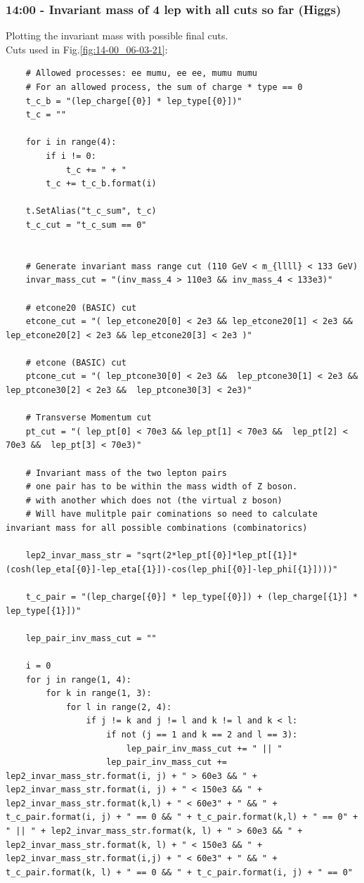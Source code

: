 \subsubsection{14:00 - Invariant mass of 4 lep with all cuts so far (Higgs)}
Plotting the invariant mass with possible final cuts.
\\
Cuts used in Fig.\ref{fig:14-00_06-03-21}:
\begin{lstlisting}
    # Allowed processes: ee mumu, ee ee, mumu mumu
    # For an allowed process, the sum of charge * type == 0 
    t_c_b = "(lep_charge[{0}] * lep_type[{0}])"  
    t_c = ""
    
    for i in range(4):
        if i != 0:
            t_c += " + "
        t_c += t_c_b.format(i)

    t.SetAlias("t_c_sum", t_c)
    t_c_cut = "t_c_sum == 0"
    
    
    # Generate invariant mass range cut (110 GeV < m_{llll} < 133 GeV)
    invar_mass_cut = "(inv_mass_4 > 110e3 && inv_mass_4 < 133e3)"
    
    # etcone20 (BASIC) cut
    etcone_cut = "( lep_etcone20[0] < 2e3 && lep_etcone20[1] < 2e3 && lep_etcone20[2] < 2e3 && lep_etcone20[3] < 2e3 )"
    
    # etcone (BASIC) cut
    ptcone_cut = "( lep_ptcone30[0] < 2e3 &&  lep_ptcone30[1] < 2e3 && lep_ptcone30[2] < 2e3 &&  lep_ptcone30[3] < 2e3)"
    
    # Transverse Momentum cut
    pt_cut = "( lep_pt[0] < 70e3 && lep_pt[1] < 70e3 &&  lep_pt[2] < 70e3 &&  lep_pt[3] < 70e3)"
    
    # Invariant mass of the two lepton pairs 
    # one pair has to be within the mass width of Z boson.
    # with another which does not (the virtual z boson)
    # Will have mulitple pair cominations so need to calculate invariant mass for all possible combinations (combinatorics)

    lep2_invar_mass_str = "sqrt(2*lep_pt[{0}]*lep_pt[{1}]*(cosh(lep_eta[{0}]-lep_eta[{1}])-cos(lep_phi[{0}]-lep_phi[{1}])))"

    t_c_pair = "(lep_charge[{0}] * lep_type[{0}]) + (lep_charge[{1}] * lep_type[{1}])"

    lep_pair_inv_mass_cut = ""

    i = 0
    for j in range(1, 4):
        for k in range(1, 3):
            for l in range(2, 4):
                if j != k and j != l and k != l and k < l:
                    if not (j == 1 and k == 2 and l == 3):
                        lep_pair_inv_mass_cut += " || "
                    lep_pair_inv_mass_cut += lep2_invar_mass_str.format(i, j) + " > 60e3 && " + lep2_invar_mass_str.format(i, j) + " < 150e3 && " + lep2_invar_mass_str.format(k,l) + " < 60e3" + " && " + t_c_pair.format(i, j) + " == 0 && " + t_c_pair.format(k,l) + " == 0" + " || " + lep2_invar_mass_str.format(k, l) + " > 60e3 && " + lep2_invar_mass_str.format(k, l) + " < 150e3 && " + lep2_invar_mass_str.format(i,j) + " < 60e3" + " && " + t_c_pair.format(k, l) + " == 0 && " + t_c_pair.format(i, j) + " == 0"
    

\end{lstlisting}
